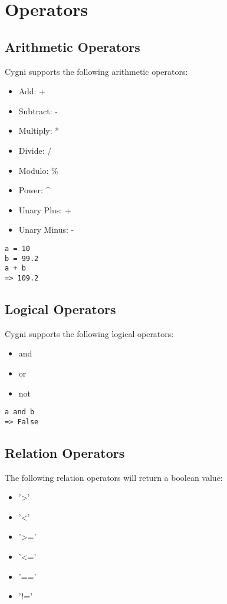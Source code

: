 \chapter{Operators}
\section{Arithmetic Operators}
 Cygni supports the following arithmetic operators:
 \begin{itemize}
 	\item Add: +
 	\item Subtract: -
 	\item Multiply: *
 	\item Divide: /
 	\item Modulo: \%
 	\item Power: \^{}
 	\item Unary Plus: +
 	\item Unary Minus: -
\end{itemize}
\begin{lstlisting}
a = 10
b = 99.2
a + b
=> 109.2
\end{lstlisting}
\section{Logical Operators}
Cygni supports the following logical operators:
\begin{itemize}
 	\item and
 	\item or
 	\item not
\end{itemize}
\begin{lstlisting}
a and b
=> False
\end{lstlisting}
\section{Relation Operators}
The following relation operators will return a boolean value:
\begin{itemize}
	\item '>'
	\item '<'
	\item '>='
	\item '<='
	\item '=='
	\item '!='
\end{itemize}